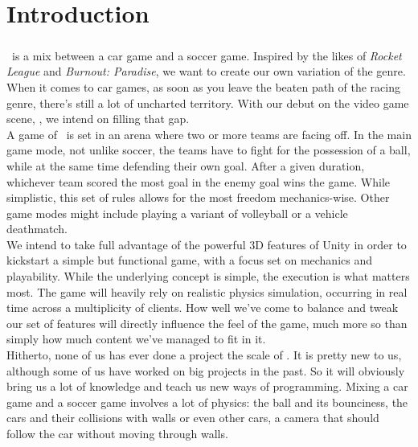 


\chapter{Introduction}

\paragraph{}\FR~is a mix between a car game and a soccer game. Inspired by the likes of \emph{Rocket League} and \emph{Burnout: Paradise}, we want to create our own variation of the genre. When it comes to car games, as soon as you leave the beaten path of the racing genre, there’s still a lot of uncharted territory. With our debut on the video game scene, \FR, we intend on filling that gap.\\


A game of \FR~is set in an arena where two or more teams are facing off. In the main game mode, not unlike soccer, the teams have to fight for the possession of a ball, while at the same time defending their own goal. After a given duration, whichever team scored the most goal in the enemy goal wins the game. While simplistic, this set of rules allows for the most freedom mechanics-wise. Other game modes might include playing a variant of volleyball or a vehicle deathmatch.\\


We intend to take full advantage of the powerful 3D features of Unity in order to kickstart a simple but functional game, with a focus set on mechanics and playability. While the underlying concept is simple, the execution is what matters most. The game will heavily rely on realistic physics simulation, occurring in real time across a multiplicity of clients. How well we've come to balance and tweak our set of features will directly influence the feel of the game, much more so than simply how much content we've managed to fit in it.\\


Hitherto, none of us has ever done a project the scale of \FR. It is pretty new to us, although some of us have worked on big projects in the past. So it will obviously bring us a lot of knowledge and teach us new ways of programming. Mixing a car game and a soccer game involves a lot of physics: the ball and its bounciness, the cars and their collisions with walls or even other cars, a camera that should follow the car without moving through walls.\\



